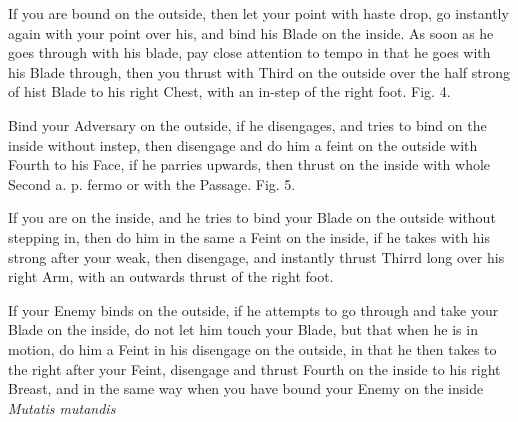 If you are bound on the outside, then let your point with haste drop,
go instantly again with your point over his, and bind his Blade on the
inside. As soon as he goes through with his blade, pay close attention
to tempo in that he goes with his Blade through, then you thrust with
Third on the outside over the half strong of hist Blade to his right
Chest, with an in-step of the right foot. Fig. 4.

\exercise{}

Bind your Adversary on the outside, if he disengages, and tries to
bind on the inside without instep, then disengage and do him a feint
on the outside with Fourth to his Face, if he parries upwards, then
thrust on the inside with whole Second a. p. fermo or with the
Passage. Fig. 5.

If you are on the inside, and he tries to bind your Blade on the
outside without stepping in, then do him in the same a Feint on the
inside, if he takes with his strong after your weak, then disengage,
and instantly thrust Thirrd long over his right Arm, with an outwards
thrust of the right foot.

\exercise{}

If your Enemy binds on the outside, if he attempts to go through and
take your Blade on the inside, do not let him touch your Blade, but
that when he is in motion, do him a Feint in his disengage on the
outside, in that he then takes to the right after your Feint,
disengage and thrust Fourth on the inside to his right Breast, and in
the same way when you have bound your Enemy on the inside {\it Mutatis
mutandis}

